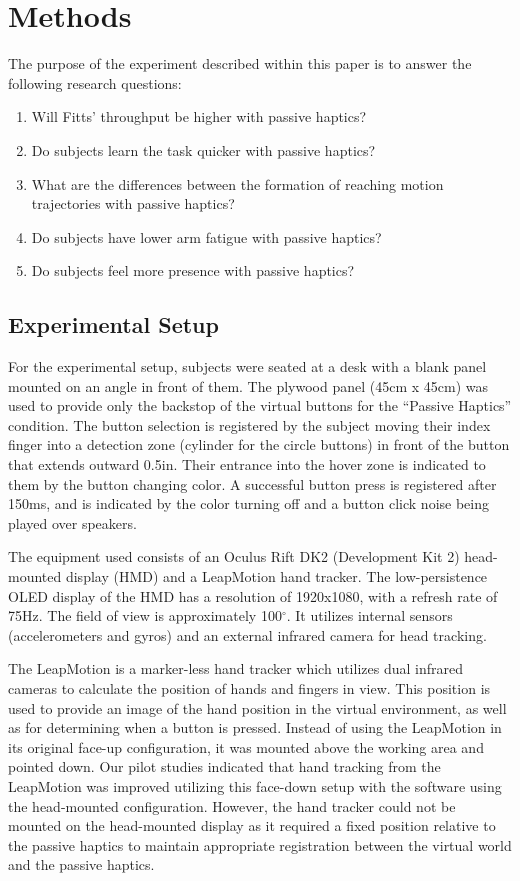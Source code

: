 \section{Methods}

The purpose of the experiment described within this paper is to answer the following research questions:

\begin{enumerate}
    \item Will Fitts' throughput be higher with passive haptics?
    \item Do subjects learn the task quicker with passive haptics?
    \item What are the differences between the formation of reaching motion trajectories with passive haptics?
    \item Do subjects have lower arm fatigue with passive haptics?
    \item Do subjects feel more presence with passive haptics?
\end{enumerate}

\subsection{Experimental Setup}

For the experimental setup, subjects were seated at a desk with a blank panel mounted on an angle in front of them.
The plywood panel (45cm x 45cm) was used to provide only the backstop of the virtual buttons for the ``Passive Haptics'' condition.
The button selection is registered by the subject moving their index finger into a detection zone (cylinder for the circle buttons) in front of the button that extends outward 0.5in.
Their entrance into the hover zone is indicated to them by the button changing color.
A successful button press is registered after 150ms, and is indicated by the color turning off and a button click noise being played over speakers.

The equipment used consists of an Oculus Rift DK2 (Development Kit 2) head-mounted display (HMD) and a LeapMotion hand tracker.
The low-persistence OLED display of the HMD has a resolution of 1920x1080, with a refresh rate of 75Hz.
The field of view is approximately 100$^\circ$.
It utilizes internal sensors (accelerometers and gyros) and an external infrared camera for head tracking.

The LeapMotion is a marker-less hand tracker which utilizes dual infrared cameras to calculate the position of hands and fingers in view.
This position is used to provide an image of the hand position in the virtual environment, as well as for determining when a button is pressed.
Instead of using the LeapMotion in its original face-up configuration, it was mounted above the working area and pointed down.
Our pilot studies indicated that hand tracking from the LeapMotion was improved utilizing this face-down setup with the software using the head-mounted configuration.
However, the hand tracker could not be mounted on the head-mounted display as it required a fixed position relative to the passive haptics to maintain appropriate registration between the virtual world and the passive haptics.

